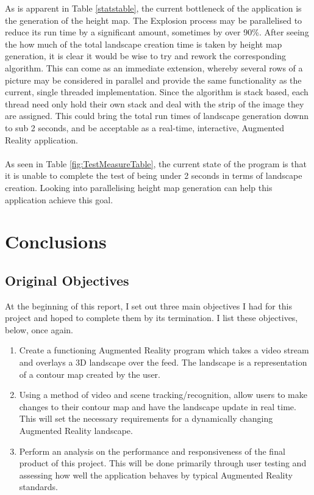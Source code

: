 \documentclass[11pt]{article}
\begin{document}
As is apparent in Table \ref{statstable}, the current 
bottleneck of the application is the generation of the 
height map. The Explosion process may be parallelised to
reduce its run time by a significant amount, sometimes 
by over 90\%. After seeing the how much of the total
landscape creation time is taken by height map generation,
it is clear it would be wise to try and rework the
corresponding algorithm. This can come as an 
immediate extension, whereby several rows of a picture may
be considered in parallel and provide the same functionality
as the current, single threaded implementation. Since the
algorithm is stack based, each thread need only hold
their own stack and deal with the strip of the image
they are assigned. This could bring the total run times
of landscape generation downn to sub 2 seconds, and be
acceptable as a real-time, interactive, Augmented Reality
application. \\
\\
As seen in Table \ref{fig:TestMeasureTable}, the current state
of the program is that it is unable to complete the 
test of being under 2 seconds in terms of landscape creation.
Looking into parallelising height map generation can help
this application achieve this goal.

\section{Conclusions}
\subsection{Original Objectives}
At the beginning of this report, I set out three main 
objectives I had for this project and hoped to complete them
by its termination. I list these objectives, below, once 
again.

\begin{enumerate}
	\item Create a functioning Augmented Reality program which takes a
		  video stream and overlays a 3D landscape over the feed. The
		  landscape is a representation of a contour map created by
		  the user.
	\item Using a method of video and scene tracking/recognition, allow users
		  to make changes to their contour map and have the landscape update 
		  in real time. This will set the necessary requirements for a
		  dynamically changing Augmented Reality landscape.
	\item Perform an analysis on the performance and responsiveness 
		  of the final product of this project. This will be done
		  primarily through user testing and assessing how well the
		  application behaves by typical Augmented Reality standards.
\end{enumerate}
\end{document}
